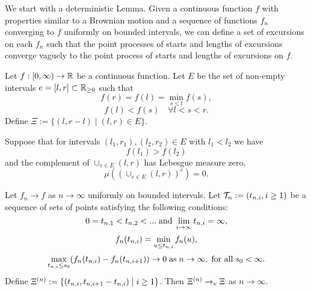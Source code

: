 
We start with a deterministic Lemma.
Given a continuous function $f$ with properties similar to a Brownian motion
and a sequence of functions $f_n$ converging to $f$ uniformly on bounded intervals,
we can define a set of excursions on each $f_n$ such that
the point processes of starts and lengths of excursions converge vaguely to the point process of starts and lengths of excursions on $f$.

\begin{lemma} \label{L: Deterministic Lemma}
	Let $f:[0, \infty) \rightarrow \mathbb{R}$ be a continuous function. 
	Let $E$ be the set of non-empty intervals 
	$e=[l,r] \subset \mathbb{R}_{\geq 0}$
	such that
	\begin{equation} \label{E: f cond 1}
	f(r) = f(l) = \min_{s \leq l} f(s),
	\end{equation}
	\begin{equation} \label{E: f cond 2}
	f(l) < f(s) \quad \forall l < s < r.
	\end{equation}
	Define $\Xi := \lbrace (l, r-l) \; | \; (l, r) \in E \rbrace$.
	
	Suppose that for intervals $(l_1, r_1), (l_2, r_2) \in E$ with $l_1 < l_2$ we have 
	\begin{equation} \label{E: f cond f(l1) > f(l2)}
	f(l_1) > f(l_2)
	\end{equation}
	and the complement of $\cup_{e \in E} (l,r)$ has Lebesgue measure zero,
	\begin{equation} \label{E: f cond complement zero}
	\mu \left( \left( \cup_{e \in E} (l,r) \right)^c\right) = 0.
	\end{equation}
	
	Let $f_n \rightarrow f$ as $n \rightarrow \infty$ uniformly on bounded intervals.
	Let $\mathcal{T}_n := (t_{n, i}, i \geq 1)$ be a sequence of sets of points satisfying the following conditions:
	\begin{equation} \label{E: fn cond 3}
	0 = t_{n, 1} < t_{n, 2} < ... \; \text{and} \; \lim_{i \rightarrow \infty} t_{n, i} = \infty,
	\end{equation}
	\begin{equation} \label{E: fn cond 4}
	f_n(t_{n, i}) = \min_{u \leq t_{n, i}}f_n(u), 
	\end{equation}
	\begin{equation} \label{E: fn cond 5}
	\max_{t_{n, i} \leq s_0}(f_n(t_{n, i}) - f_n(t_{n, i+1})) \rightarrow 0 \; \text{as} \; n \rightarrow \infty, \; \text{for all} \; s_0 < \infty.
	\end{equation}
	Define $\Xi^{(n)} := \lbrace (t_{n, i}, t_{n, i+1} - t_{n, i}) \; | \; i \geq 1 \rbrace$.
	Then $\Xi^{(n)} \rightarrow_v \Xi$ as $n \rightarrow \infty$.
\end{lemma}

